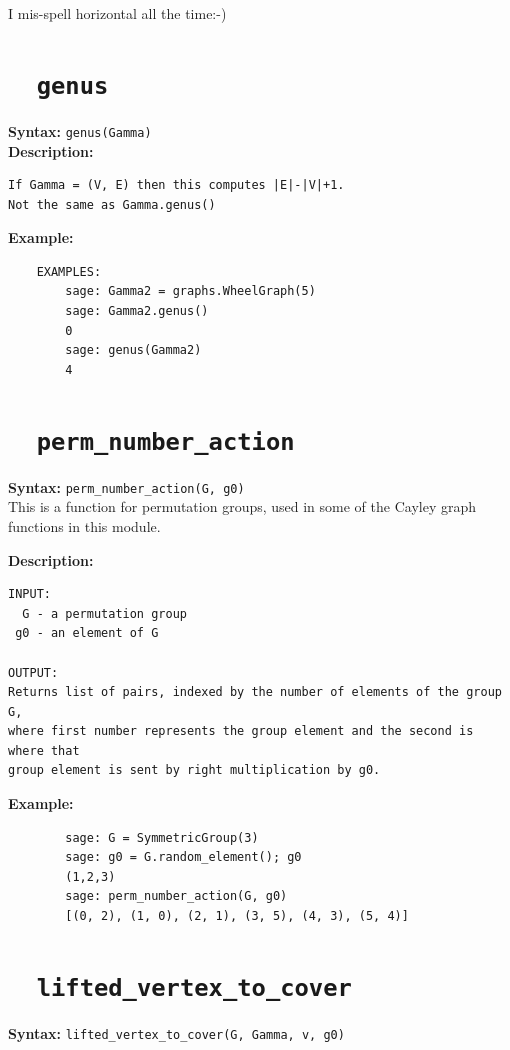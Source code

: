 \documentclass{article}
\begin{document}
I mis-spell horizontal all the time:-)

\section{\tt \ \ genus}

\textbf{Syntax:} \verb}genus(Gamma)}\\

\textbf{Description:}
\begin{verbatim}
If Gamma = (V, E) then this computes |E|-|V|+1. 
Not the same as Gamma.genus()
\end{verbatim}

\textbf{Example:}
\begin{verbatim}
    EXAMPLES:
        sage: Gamma2 = graphs.WheelGraph(5)
        sage: Gamma2.genus()
        0
        sage: genus(Gamma2)
        4
\end{verbatim}

\section{\tt \ \ perm\_number\_action}

\textbf{Syntax:} \verb}perm_number_action(G, g0)}\\

This is a function for permutation groups, used in some of the Cayley graph functions
in this module.

\textbf{Description:}
\begin{verbatim}
INPUT:
  G - a permutation group
 g0 - an element of G

OUTPUT:
Returns list of pairs, indexed by the number of elements of the group G, 
where first number represents the group element and the second is where that 
group element is sent by right multiplication by g0.
\end{verbatim}

\textbf{Example:}
\begin{verbatim}
        sage: G = SymmetricGroup(3)
        sage: g0 = G.random_element(); g0
        (1,2,3)
        sage: perm_number_action(G, g0)
        [(0, 2), (1, 0), (2, 1), (3, 5), (4, 3), (5, 4)]
\end{verbatim}

\section{\tt \ \ lifted\_vertex\_to\_cover}

\textbf{Syntax:} \verb}lifted_vertex_to_cover(G, Gamma, v, g0)}\\
\end{document}
